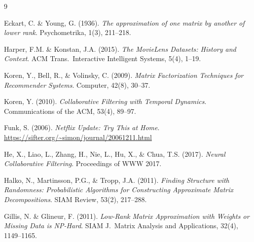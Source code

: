 \documentclass[12pt, a4paper]{article}
\begin{document}

\begin{thebibliography}{9}

Eckart, C. \& Young, G. (1936).
\textit{The approximation of one matrix by another of lower rank}.
Psychometrika, 1(3), 211--218.

Harper, F.M. \& Konstan, J.A. (2015).
\textit{The MovieLens Datasets: History and Context}.
ACM Trans.\ Interactive Intelligent Systems, 5(4), 1--19.

Koren, Y., Bell, R., \& Volinsky, C. (2009).
\textit{Matrix Factorization Techniques for Recommender Systems}.
Computer, 42(8), 30--37.

Koren, Y. (2010).
\textit{Collaborative Filtering with Temporal Dynamics}.
Communications of the ACM, 53(4), 89--97.

Funk, S. (2006).
\textit{Netflix Update: Try This at Home}.
\url{https://sifter.org/~simon/journal/20061211.html}

He, X., Liao, L., Zhang, H., Nie, L., Hu, X., \& Chua, T.S. (2017).
\textit{Neural Collaborative Filtering}.
Proceedings of WWW 2017.

Halko, N., Martinsson, P.G., \& Tropp, J.A. (2011).
\textit{Finding Structure with Randomness: Probabilistic Algorithms
for Constructing Approximate Matrix Decompositions}.
SIAM Review, 53(2), 217--288.

Gillis, N. \& Glineur, F. (2011).
\textit{Low-Rank Matrix Approximation with Weights or Missing Data is NP-Hard}.
SIAM J.\ Matrix Analysis and Applications, 32(4), 1149--1165.

\end{thebibliography}
\end{document}
